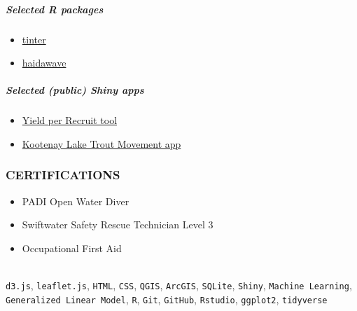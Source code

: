 \documentclass[
]{article}
\providecommand{\tightlist}{%
  \setlength{\itemsep}{0pt}\setlength{\parskip}{0pt}}
\begin{document}
\hypertarget{selected-r-packages}{%
\subparagraph{Selected R packages}\label{selected-r-packages}}

\begin{itemize}
\tightlist
\item
  \href{https://github.com/poissonconsulting/tinter}{tinter}
\item
  \href{https://github.com/sebdalgarno/haidawave}{haidawave}
\end{itemize}

\hypertarget{selected-public-shiny-apps}{%
\subparagraph{Selected (public) Shiny
apps}\label{selected-public-shiny-apps}}

\begin{itemize}
\tightlist
\item
  \href{https://poissonconsulting.shinyapps.io/ypr-shiny/}{Yield per
  Recruit tool}
\item
  \href{https://poissonconsulting.shinyapps.io/klexdatr-movement/}{Kootenay
  Lake Trout Movement app}\\
  \hspace*{0.333em}
\end{itemize}

\hypertarget{certifications}{%
\subsubsection{CERTIFICATIONS}\label{certifications}}

\begin{itemize}
\tightlist
\item
  PADI Open Water Diver\\
\item
  Swiftwater Safety Rescue Technician Level 3\\
\item
  Occupational First Aid\\
  \hspace*{0.333em}\\
\end{itemize}

\texttt{d3.js}, \texttt{leaflet.js}, \texttt{HTML}, \texttt{CSS},
\texttt{QGIS}, \texttt{ArcGIS}, \texttt{SQLite}, \texttt{Shiny},
\texttt{Machine\ Learning}, \texttt{Generalized\ Linear\ Model},
\texttt{R}, \texttt{Git}, \texttt{GitHub}, \texttt{Rstudio},
\texttt{ggplot2}, \texttt{tidyverse}
\end{document}
